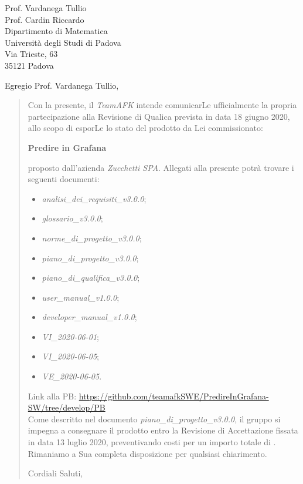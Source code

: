 \begin{letter}{
		Prof. Vardanega Tullio \\
		Prof. Cardin Riccardo \\
		Dipartimento di Matematica \\
		Università degli Studi di Padova \\
		Via Trieste, 63 \\
		35121 Padova}
		
\opening{Egregio Prof. Vardanega Tullio,}

\begin{quotation}
Con la presente, il \textit{TeamAFK} intende comunicarLe ufficialmente la propria partecipazione alla Revisione di Qualica prevista in data 18 giugno 2020, allo scopo di esporLe lo stato del prodotto da Lei commissionato:

\begin{center}
	\textbf{Predire in Grafana}
\end{center}

\noindent proposto dall'azienda \textit{Zucchetti SPA}.
Allegati alla presente potrà trovare i seguenti documenti:
\begin{itemize}
	\item \textit{analisi\_dei\_requisiti\_v3.0.0};
	
	\item \textit{glossario\_v3.0.0};
	
	\item \textit{norme\_di\_progetto\_v3.0.0};

	\item \textit{piano\_di\_progetto\_v3.0.0};

	\item \textit{piano\_di\_qualifica\_v3.0.0};
	
	\item \textit{user\_manual\_v1.0.0};
	\item \textit{developer\_manual\_v1.0.0};
	
	\item \textit{VI\_2020-06-01};
	\item \textit{VI\_2020-06-05};
	\item \textit{VE\_2020-06-05}.
\end{itemize}
\noindent 
Link alla PB: \url{https://github.com/teamafkSWE/PredireInGrafana-SW/tree/develop/PB}\\
Come descritto nel documento \textit{piano\_di\_progetto\_v3.0.0}, il gruppo si impegna a consegnare il prodotto entro la Revisione di Accettazione fissata in data 13 luglio 2020, preventivando costi per un importo totale di \textbf{}.\\
Rimaniamo a Sua completa disposizione per qualsiasi chiarimento.

\vspace{0.5cm}
\closing{ Cordiali Saluti,}
	

\end{quotation}
		
\end{letter}